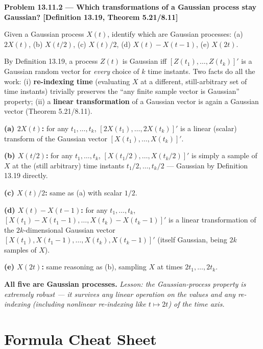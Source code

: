 \documentclass[11pt]{article}
\newcommand{\topline}[1]{\par\vspace{5pt}\noindent{\color{#1}\rule{\linewidth}{1.1pt}}\par\vspace{3pt}}
\newcommand{\botline}[1]{\par\vspace{2pt}\noindent{\color{#1}\rule{\linewidth}{1.1pt}}\par\vspace{8pt}}
\newenvironment{examprob}[2]{%
  \topline{examcol}\noindent\textbf{\color{examcol}#1 --- #2}\par\smallskip\noindent\ignorespaces
}{\botline{examcol}}
\begin{document}
\begin{examprob}{Problem 13.11.2}{Which transformations of a Gaussian process stay Gaussian? \hfill [Definition 13.19, Theorem 5.21/8.11]}
Given a Gaussian process $X(t)$, identify which are Gaussian processes: (a) $2X(t)$,
(b) $X(t/2)$, (c) $X(t)/2$, (d) $X(t)-X(t-1)$, (e) $X(2t)$.

By Definition 13.19, a process $Z(t)$ is Gaussian iff $[Z(t_1),\dots,Z(t_k)]'$ is a Gaussian
random vector for \emph{every} choice of $k$ time instants. Two facts do all the work:
(i) \textbf{re-indexing time} (evaluating $X$ at a different, still-arbitrary set of time
instants) trivially preserves the ``any finite sample vector is Gaussian'' property; (ii) a
\textbf{linear transformation} of a Gaussian vector is again a Gaussian vector
(Theorem 5.21/8.11).

\textbf{(a) $2X(t)$:} for any $t_1,\dots,t_k$, $[2X(t_1),\dots,2X(t_k)]'$ is a linear
(scalar) transform of the Gaussian vector $[X(t_1),\dots,X(t_k)]'$. 

\textbf{(b) $X(t/2)$:} for any $t_1,\dots,t_k$, $[X(t_1/2),\dots,X(t_k/2)]'$ is simply a
sample of $X$ at the (still arbitrary) time instants $t_1/2,\dots,t_k/2$ --- Gaussian by
Definition 13.19 directly. 

\textbf{(c) $X(t)/2$:} same as (a) with scalar $1/2$. 

\textbf{(d) $X(t)-X(t-1)$:} for any $t_1,\dots,t_k$, $[X(t_1)-X(t_1-1),\dots,
X(t_k)-X(t_k-1)]'$ is a linear transformation of the $2k$-dimensional Gaussian vector
$[X(t_1),X(t_1-1),\dots,X(t_k),X(t_k-1)]'$ (itself Gaussian, being $2k$ samples of $X$).

\textbf{(e) $X(2t)$:} same reasoning as (b), sampling $X$ at times $2t_1,\dots,2t_k$.

\textbf{All five are Gaussian processes.} \emph{Lesson: the Gaussian-process property is
extremely robust --- it survives any linear operation on the values and any re-indexing
(including nonlinear re-indexing like $t\mapsto2t$) of the time axis.}
\end{examprob}

\clearpage
\part{Formula Cheat Sheet}
\label{part:cheatsheet}
\end{document}
